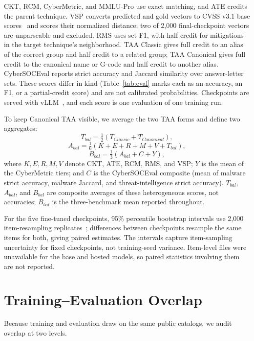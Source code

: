\documentclass[conference]{IEEEtran}
\begin{document}
CKT, RCM, CyberMetric, and MMLU-Pro use exact matching, and ATE credits the parent technique. VSP converts predicted and gold vectors to CVSS v3.1 base scores~\cite{first2019cvss} and scores their normalized distance; two of 2,000 final-checkpoint vectors are unparseable and excluded. RMS uses set F1, with half credit for mitigations in the target technique's neighborhood. TAA Classic gives full credit to an alias of the correct group and half credit to a related group; TAA Canonical gives full credit to the canonical name or G-code and half credit to another alias. CyberSOCEval reports strict accuracy and Jaccard similarity over answer-letter sets. These scores differ in kind (Table~\ref{tab:eval} marks each as an accuracy, an F1, or a partial-credit score) and are not calibrated probabilities. Checkpoints are served with vLLM~\cite{kwon2023vllm}, and each score is one evaluation of one training run.

To keep Canonical TAA visible, we average the two TAA forms and define two aggregates:
\begin{equation}
T_{bal}=\tfrac{1}{2}(T_{Classic}+T_{Canonical}),
\end{equation}
\begin{equation}
A_{bal}=\tfrac{1}{6}(K+E+R+M+V+T_{bal}),
\end{equation}
\begin{equation}
B_{bal}=\tfrac{1}{3}(A_{bal}+C+Y),
\end{equation}
where $K,E,R,M,V$ denote CKT, ATE, RCM, RMS, and VSP; $Y$ is the mean of the CyberMetric tiers; and $C$ is the CyberSOCEval composite (mean of malware strict accuracy, malware Jaccard, and threat-intelligence strict accuracy). $T_{bal}$, $A_{bal}$, and $B_{bal}$ are composite averages of these heterogeneous scores, not accuracies; $B_{bal}$ is the three-benchmark mean reported throughout.

For the five fine-tuned checkpoints, 95\% percentile bootstrap intervals use 2,000 item-resampling replicates~\cite{efron1993bootstrap}; differences between checkpoints resample the same items for both, giving paired estimates. The intervals capture item-sampling uncertainty for fixed checkpoints, not training-seed variance. Item-level files were unavailable for the base and hosted models, so paired statistics involving them are not reported.

\section{Training--Evaluation Overlap}\label{sec:overlap}
Because training and evaluation draw on the same public catalogs, we audit overlap at two levels.
\end{document}

